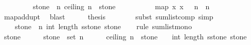 \begin{isabellebody}
\ \ \ \ \ \ \ \ {\isacharparenleft}{\isasymSum}\ stone\ {\isasymleftarrow}\ {\isacharbrackleft}{}{\isachardot}{\isachardot}{\isacharless}n{\isacharbrackright}{\isachardot}\ {\isacharparenleft}ceiling\ {\isacharparenleft}n\ {\isacharslash}\ {\isacharparenleft}stone\ {\isacharplus}\ {}{\isacharparenright}{\isacharparenright}{\isacharparenright}{\isacharparenright}{\isachardoublequoteclose}\isanewline
\ \ \isamarkupfalse%
{\isacharminus}\isanewline
\ \ \ \ \isamarkupfalse%
\ {\isachardoublequoteopen}map\ {\isacharparenleft}{\isasymlambda}x{\isachardot}\ x\ {\isacharplus}\ {}{\isacharparenright}\ {\isacharbrackleft}{}{\isachardot}{\isachardot}{\isacharless}n{\isacharbrackright}\ {\isacharequal}\ {\isacharbrackleft}{}{\isachardot}{\isachardot}{\isacharless}n{\isacharplus}{}{\isacharbrackright}{\isachardoublequoteclose}\isanewline
\ \ \ \ \ \ \isamarkupfalse%
\ map{\isacharunderscore}add{\isacharunderscore}upt\ \isamarkupfalse%
\ blast\isanewline
\ \ \ \ \isamarkupfalse%
\ {\isacharquery}thesis\isanewline
\ \ \ \ \ \ \isamarkupfalse%
\ {\isacharparenleft}subst\ sum{\isacharunderscore}list{\isacharunderscore}comp{\isacharcomma}\ simp{\isacharparenright}\isanewline
\ \ \isamarkupfalse%
\isanewline
\ \ \isamarkupfalse%
\ \isamarkupfalse%
\ {\isachardoublequoteopen}{\isachardot}{\isachardot}{\isachardot}\ {\isasymle}\ {\isacharparenleft}{\isasymSum}\ stone\ {\isasymleftarrow}\ {\isacharbrackleft}{}{\isachardot}{\isachardot}{\isacharless}n{\isacharbrackright}{\isachardot}\ int\ {\isacharparenleft}length\ {\isacharparenleft}{\isacharquery}sstone\ stone{\isacharparenright}{\isacharparenright}{\isacharparenright}{\isachardoublequoteclose}\isanewline
\ \ \isamarkupfalse%
\ {\isacharparenleft}rule\ sum{\isacharunderscore}list{\isacharunderscore}mono{\isacharparenright}\ \ \ \ \ \ \ \ \ \ \ \isanewline
\ \ \ \ \isamarkupfalse%
\ stone\isanewline
\ \ \ \ \isamarkupfalse%
\ {\isachardoublequoteopen}stone\ {\isasymin}\ set\ {\isacharbrackleft}{}{\isachardot}{\isachardot}{\isacharless}n{\isacharbrackright}{\isachardoublequoteclose}\isanewline
\ \ \ \ \isamarkupfalse%
\ {\isachardoublequoteopen}ceiling\ {\isacharparenleft}n\ {\isacharslash}\ {\isacharparenleft}stone\ {\isacharplus}\ {}{\isacharparenright}{\isacharparenright}\ {\isasymle}\ int\ {\isacharparenleft}length\ {\isacharparenleft}{\isacharquery}sstone\ stone{\isacharparenright}{\isacharparenright}{\isachardoublequoteclose}\isanewline

\end{isabellebody}
